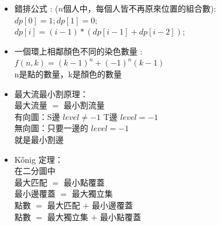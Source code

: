 \begin{itemize}
    \item 錯排公式 :  ($n$個人中，每個人皆不再原來位置的組合數): \\
      $dp[0]=1;dp[1]=0;$\\
      $dp[i]=(i-1)*(dp[i-1]+dp[i-2])$;
    \item 一個環上相鄰顏色不同的染色數量 : \\
      $f(n,k) = (k-1)^n + (-1)^n(k-1)$\\
      n是點的數量，k是顏色的數量
    \item 最大流最小割原理：\\
      最大流量 $=$ 最小割流量\\
      有向圖：S邊 $level \not= -1$ T邊 $level=-1$\\
      無向圖：只要一邊的 $level=-1$ \\
      就是最小割邊
    \item Kőnig 定理：\\
      在二分圖中\\
      最大匹配 $=$ 最小點覆蓋\\
      最小邊覆蓋 $=$ 最大獨立集\\
      點數 $=$ 最大匹配 $+$ 最小邊覆蓋\\
      點數 $=$ 最大獨立集 $+$ 最小點覆蓋
\end{itemize}